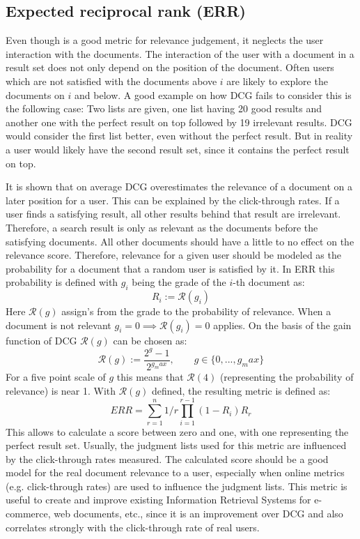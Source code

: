 \subsection{Expected reciprocal rank (ERR)}
\label{ref:qa:offlinemetrics:err}
Even though  is a good metric for relevance judgement,
it neglects the user interaction with the documents.
The interaction of the user with a document in a result set does not only depend on the position of the document.
Often users which are not satisfied with the documents above $i$ are likely to explore the documents on $i$ and below.
A good example on how DCG fails to consider this is the following case:
Two lists are given, one list having 20 good results and another one with the perfect result on top followed by 19 irrelevant results.
DCG would consider the first list better, even without the perfect result.
But in reality a user would likely have the second result set, since it contains the perfect result on top.
\par
It is shown that on average DCG overestimates the relevance of a document on a later position for a user\cite[P. 3]{chapelle_metlzer_zhang_grinspan_2009}.
This can be explained by the click-through rates. If a user finds a satisfying result, all other results behind that result are irrelevant.
Therefore, a search result is only as relevant as the documents before the satisfying documents. 
All other documents should have a little to no effect on the relevance score.
Therefore, relevance for a given user should be modeled as the probability for a document that a random user is satisfied by it.
In ERR this probability is defined with $g_i$ being the grade of the $i$-th document as:
\begin{equation}
	R_i := \mathcal{R}(g_i)
\end{equation}
Here $\mathcal{R}(g)$ assign's from the grade to the probability of relevance.
When a document is not relevant $g_i = 0 \implies \mathcal{R}(g_i) = 0$ applies. 
On the basis of the gain function of DCG $\mathcal{R}(g)$ can be chosen as:
\begin{equation}
	\mathcal{R}(g) := \frac{2^g-1}{2^{g_max}}, \qquad g \in \{0,...,g_max\}
\end{equation}
For a five point scale of $g$ this means that $\mathcal{R}(4)$ (representing the probability of relevance) is near 1.
With $\mathcal{R}(g)$ defined, the resulting metric is defined as:
\begin{equation}
	ERR = \sum_{r=1}^{n} 1/r \prod_{i=1}^{r-1} (1-R_i)R_r
\end{equation}
This allows to calculate a score between zero and one, with one representing the perfect result set\cite[P. 4]{chapelle_metlzer_zhang_grinspan_2009}.
Usually, the judgment lists used for this metric are influenced by the click-through rates measured.
The calculated score should be a good model for the real document relevance to a user,
especially when online metrics (e.g. click-through rates) are used to influence the judgment lists.
This metric is useful to create and improve existing Information Retrieval Systems for e-commerce, web documents, etc.,
since it is an improvement over DCG and also correlates strongly with the click-through rate of real users.
\pagebreak		

